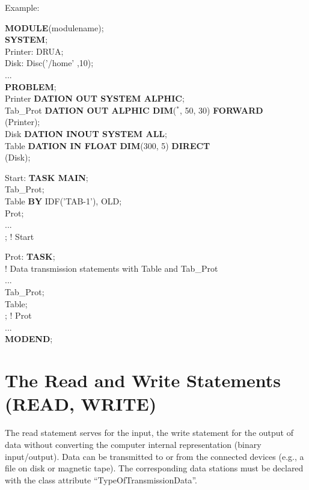 Example:

{\bf MODULE}(modulename);\\
{\bf SYSTEM};\\
\x Printer: DRUA;\\
\x Disk: Disc('/home' ,10);\\
\x ... \\
{\bf PROBLEM};\\
 Printer {\bf DATION OUT SYSTEM ALPHIC};\\
 Tab\_Prot {\bf DATION OUT ALPHIC DIM}($^*$, 50, 30) {\bf FORWARD}\\
\x {}(Printer);\\
 Disk {\bf DATION INOUT SYSTEM ALL};\\
 Table {\bf DATION IN FLOAT DIM}(300, 5) {\bf DIRECT}\\
\x {}(Disk);

Start: {\bf TASK MAIN};\\
 Tab\_Prot;\\
 Table {\bf BY} IDF('TAB-1'), OLD;\\
 Prot;\\
\x ...\\
; ! Start

Prot: {\bf TASK};\\
\x ! Data transmission statements with Table and Tab\_Prot\\
\x ...\\
 Tab\_Prot;\\
 Table; \\
; ! Prot \\
... \\
{\bf MODEND};

\section{The Read and Write Statements (READ, WRITE)}   %
\label{sec_read_write}

The read statement serves for the input, the write statement for the
output of data without converting the computer internal representation
(binary input/output). Data can be transmitted to or from the connected
devices (e.g., a file on disk or magnetic tape). The corresponding data
stations must be declared with the class attribute
``TypeOfTransmissionData''.

